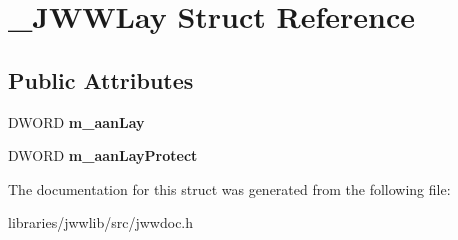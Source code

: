 \hypertarget{struct__JWWLay}{\section{\-\_\-\-J\-W\-W\-Lay Struct Reference}
\label{struct__JWWLay}
}
\subsection*{Public Attributes}
\begin{DoxyCompactItemize}
\item 
\hypertarget{struct__JWWLay_affe7a16272822e3452bbca7fac07d6a4}{D\-W\-O\-R\-D {\bfseries m\-\_\-aan\-Lay}}\label{struct__JWWLay_affe7a16272822e3452bbca7fac07d6a4}

\item 
\hypertarget{struct__JWWLay_ac04c40a364cd6e18d794eacf1dfa405f}{D\-W\-O\-R\-D {\bfseries m\-\_\-aan\-Lay\-Protect}}\label{struct__JWWLay_ac04c40a364cd6e18d794eacf1dfa405f}

\end{DoxyCompactItemize}


The documentation for this struct was generated from the following file\-:\begin{DoxyCompactItemize}
\item 
libraries/jwwlib/src/jwwdoc.\-h\end{DoxyCompactItemize}
